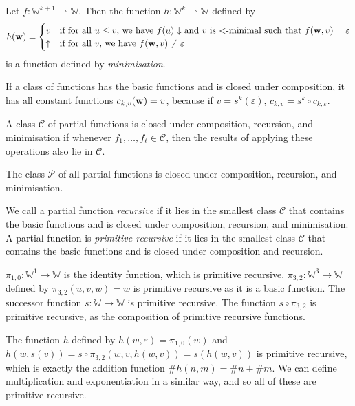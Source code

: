 Let \( f \colon \mathbb W^{k+1} \rightharpoonup \mathbb W \).
Then the function \( h \colon \mathbb W^k \rightharpoonup \mathbb W \) defined by
\[ h(\vb w) = \begin{cases}
	v & \text{if for all \( u \leq v \), we have \( f(u) \downarrow \) and \( v \) is \( < \)-minimal such that \( f(\vb w, v) = \varepsilon \)} \\
	\uparrow & \text{if for all \( v \), we have \( f(\vb w, v) \neq \varepsilon \)}
\end{cases} \]
is a function defined by \emph{minimisation}.
\begin{remark}
	If a class of functions has the basic functions and is closed under composition, it has all constant functions \( c_{k,v}(\vb w) = v \), because if \( v = s^k(\varepsilon) \), \( c_{k,v} = s^k \circ c_{k,\varepsilon} \).
\end{remark}
\begin{definition}
	A class \( \mathcal C \) of partial functions is closed under composition, recursion, and minimisation if whenever \( f_1, \dots, f_\ell \in \mathcal C \), then the results of applying these operations also lie in \( \mathcal C \).
\end{definition}
\begin{remark}
	The class \( \mathcal P \) of all partial functions is closed under composition, recursion, and minimisation.
\end{remark}
\begin{definition}
	We call a partial function \emph{recursive} if it lies in the smallest class \( \mathcal C \) that contains the basic functions and is closed under composition, recursion, and minimisation.
	A partial function is \emph{primitive recursive} if it lies in the smallest class \( \mathcal C \) that contains the basic functions and is closed under composition and recursion.
\end{definition}
\begin{example}
	\( \pi_{1,0} \colon \mathbb W^1 \to \mathbb W \) is the identity function, which is primitive recursive.
	\( \pi_{3,2} \colon \mathbb W^3 \to \mathbb W \) defined by \( \pi_{3,2}(u,v,w) = w \) is primitive recursive as it is a basic function.
	The successor function \( s \colon \mathbb W \to \mathbb W \) is primitive recursive.
	The function \( s \circ \pi_{3,2} \) is primitive recursive, as the composition of primitive recursive functions.

	The function \( h \) defined by \( h(w,\varepsilon) = \pi_{1,0}(w) \) and \( h(w,s(v)) = s \circ \pi_{3,2}(w,v,h(w,v)) = s(h(w,v)) \) is primitive recursive, which is exactly the addition function \( \# h(n,m) = \# n + \# m \).
	We can define multiplication and exponentiation in a similar way, and so all of these are primitive recursive.
\end{example}
